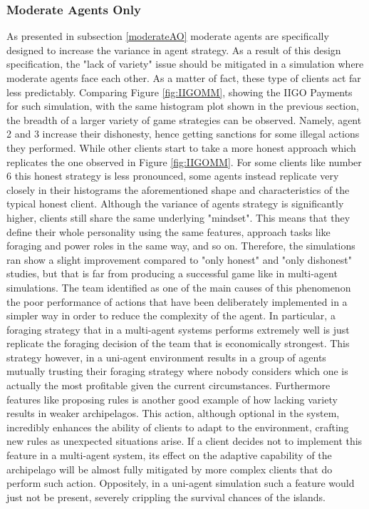 \subsubsection{Moderate Agents Only}
As presented in subsection \ref{moderateAO} moderate agents are specifically designed to increase the variance in agent strategy. As a result of this design specification, the "lack of variety" issue should be mitigated in a simulation where moderate agents face each other. As a matter of fact, these type of clients act far less predictably. Comparing Figure \ref{fig:IIGOMM}, showing the IIGO Payments for such simulation, with the same histogram plot shown in the previous section, the breadth of a larger variety of game strategies can be observed. Namely, agent 2 and 3 increase their dishonesty, hence getting sanctions for some illegal actions they performed. While other clients start to take a more honest approach which replicates the one observed in Figure \ref{fig:IIGOMM}. For some clients like number 6 this honest strategy is less pronounced, some agents instead replicate very closely in their histograms the aforementioned shape and characteristics of the typical honest client. Although the variance of agents strategy is significantly higher, clients still share the same underlying "mindset". This means that they define their whole personality using the same features, approach tasks like foraging and power roles in the same way, and so on. Therefore, the simulations ran show a slight improvement compared to "only honest" and "only dishonest" studies, but that is far from producing a successful game like in multi-agent simulations. The team identified as one of the main causes of this phenomenon the poor performance of actions that have been deliberately implemented in a simpler way in order to reduce the complexity of the agent. In particular, a foraging strategy that in a multi-agent systems performs extremely well is just replicate the foraging decision of the team that is economically strongest. This strategy however, in a uni-agent environment results in a group of agents mutually trusting their foraging strategy where nobody considers which one is actually the most profitable given the current circumstances. Furthermore features like proposing rules is another good example of how lacking variety results in weaker archipelagos. This action, although optional in the system, incredibly enhances the ability of clients to adapt to the environment, crafting new rules as unexpected situations arise. If a client decides not to implement this feature in a multi-agent system, its effect on the adaptive capability of the archipelago will be almost fully mitigated by more complex clients that do perform such action. Oppositely, in a uni-agent simulation such a feature would just not be present, severely crippling the survival chances of the islands.

